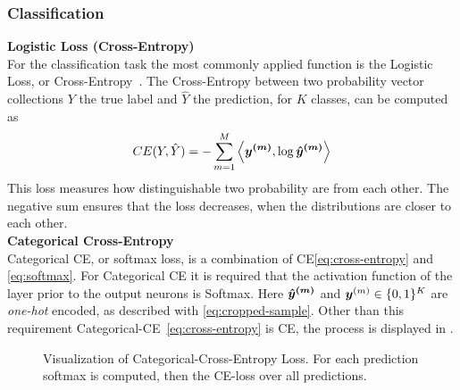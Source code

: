\subsubsection{Classification}\label{subsubsec:classification-loss}
\textbf{Logistic Loss (Cross-Entropy)}\\
For the classification task the most commonly applied function is the Logistic Loss, or Cross-Entropy~\cite{handsOn}.
The Cross-Entropy between two probability vector collections ${Y}$ the true label and $\hat{Y}$ the prediction, for $K$ classes, can be computed as
\begin{align}
    CE(Y, \hat{Y}) = - \sum \limits_{m=1}^M
    \left\langle
        \bm{y^{(m)}},     \log{\bm{\hat{y}^{(m)}}}
    \right\rangle
    \label{eq:cross-entropy}
\end{align}
This loss measures how distinguishable two probability are from each other.
The negative sum ensures that the loss decreases, when the distributions are closer to each other.\\
\textbf{Categorical Cross-Entropy}\\
Categorical CE, or softmax loss, is a combination of CE\eqref{eq:cross-entropy} and \eqref{eq:softmax}.
For Categorical CE it is required that the activation function of the layer prior to the output neurons is Softmax.
Here $\bm{\hat{y}^{(m)}}$ and $\bm{y}^{(m)}\in\{0,1\}^K$ are \textit{one-hot} encoded, as described with \eqref{eq:cropped-sample}.
Other than this requirement Categorical-CE~\eqref{eq:cross-entropy} is CE, the process is displayed in .
\begin{figure}[!ht]
    \centering
    \caption{Visualization of Categorical-Cross-Entropy Loss. For each prediction softmax is computed, then the CE-loss over all predictions.}
    \label{fig:cat-ce}
\end{figure}
